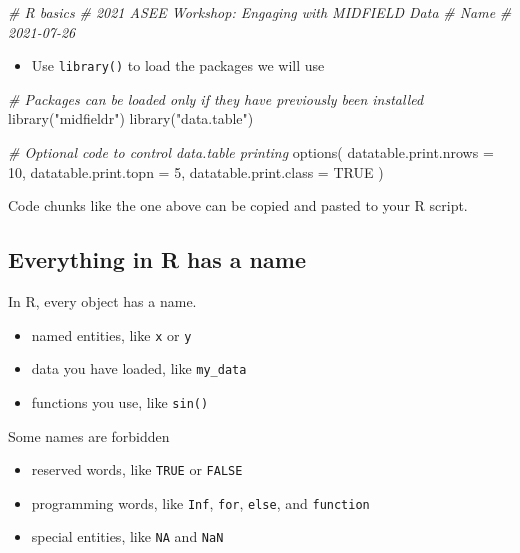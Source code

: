 \documentclass[
]{book}
\newenvironment{Shaded}{\begin{snugshade}}{\end{snugshade}}
\newcommand{\AttributeTok}[1]{\textcolor[rgb]{0.77,0.63,0.00}{#1}}
\newcommand{\CommentTok}[1]{\textcolor[rgb]{0.56,0.35,0.01}{\textit{#1}}}
\newcommand{\ConstantTok}[1]{\textcolor[rgb]{0.00,0.00,0.00}{#1}}
\newcommand{\DecValTok}[1]{\textcolor[rgb]{0.00,0.00,0.81}{#1}}
\newcommand{\FunctionTok}[1]{\textcolor[rgb]{0.00,0.00,0.00}{#1}}
\newcommand{\NormalTok}[1]{#1}
\newcommand{\StringTok}[1]{\textcolor[rgb]{0.31,0.60,0.02}{#1}}
\providecommand{\tightlist}{%
  \setlength{\itemsep}{0pt}\setlength{\parskip}{0pt}}
\begin{document}
\begin{Shaded}
\begin{Highlighting}[]
\CommentTok{\# R basics }
\CommentTok{\# 2021 ASEE Workshop: Engaging with MIDFIELD Data}
\CommentTok{\# Name }
\CommentTok{\# 2021{-}07{-}26}
\end{Highlighting}
\end{Shaded}

\begin{itemize}
\tightlist
\item
  Use \texttt{library()} to load the packages we will use
\end{itemize}

\begin{Shaded}
\begin{Highlighting}[]
\CommentTok{\# Packages can be loaded only if they have previously been installed}
\FunctionTok{library}\NormalTok{(}\StringTok{"midfieldr"}\NormalTok{)}
\FunctionTok{library}\NormalTok{(}\StringTok{"data.table"}\NormalTok{)}

\CommentTok{\# Optional code to control data.table printing}
\FunctionTok{options}\NormalTok{(}
  \AttributeTok{datatable.print.nrows =} \DecValTok{10}\NormalTok{,}
  \AttributeTok{datatable.print.topn =} \DecValTok{5}\NormalTok{,}
  \AttributeTok{datatable.print.class =} \ConstantTok{TRUE}
\NormalTok{)}
\end{Highlighting}
\end{Shaded}

Code chunks like the one above can be copied and pasted to your R script.

\hypertarget{everything-in-r-has-a-name}{%
\subsection{Everything in R has a name}\label{everything-in-r-has-a-name}}

In R, every object has a name.

\begin{itemize}
\tightlist
\item
  named entities, like \texttt{x} or \texttt{y}\\
\item
  data you have loaded, like \texttt{my\_data}
\item
  functions you use, like \texttt{sin()}
\end{itemize}

Some names are forbidden

\begin{itemize}
\tightlist
\item
  reserved words, like \texttt{TRUE} or \texttt{FALSE}\\
\item
  programming words, like \texttt{Inf}, \texttt{for}, \texttt{else}, and \texttt{function}\\
\item
  special entities, like \texttt{NA} and \texttt{NaN}
\end{itemize}
\end{document}
